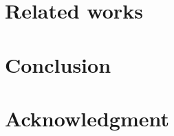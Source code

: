 \documentclass[11pt]{cambrian}
\begin{document}
\section{Related works}
\label{relatedworks}


% 


\section{Conclusion}
\label{Conclusion}

% 








\section*{Acknowledgment}


\newpage
\printbibliography[heading=bibintoc]

\newpage
\appendix
\onecolumn
\tableofcontents


\end{document}
